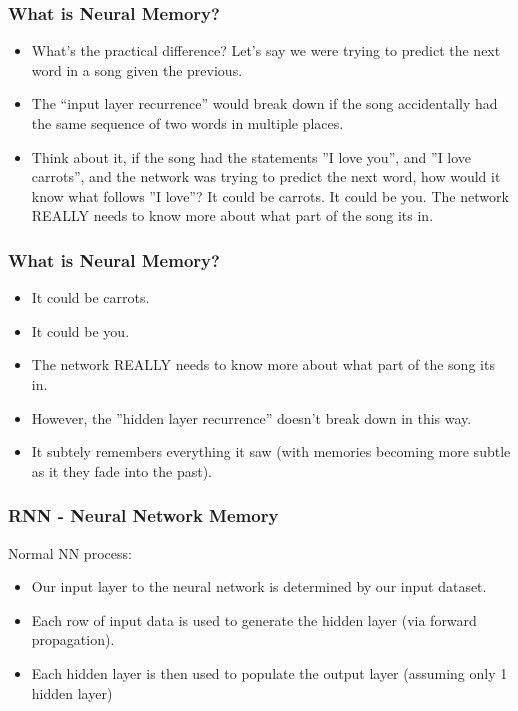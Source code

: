 \begin{frame}[fragile] \frametitle{What is Neural Memory?}
\begin{itemize}
\item  What's the practical difference? Let's say we were trying to predict the next word in a song given the previous. 
\item The ``input layer recurrence'' would break down if the song accidentally had the same sequence of two words in multiple places. 
\item Think about it, if the song had the statements ''I love you'', and ''I love carrots'', and the network was trying to predict the next word, how would it know what follows ''I love''? 
It could be carrots. It could be you. The network REALLY needs to know more about what part of the song its in.
\end{itemize}
\end{frame}


\begin{frame}[fragile] \frametitle{What is Neural Memory?}
\begin{itemize}
\item  It could be carrots. 
\item It could be you. 
\item The network REALLY needs to know more about what part of the song its in.
\item However, the ''hidden layer recurrence'' doesn't break down in this way. 
\item It subtely remembers everything it saw (with memories becoming more subtle as it they fade into the past).
\end{itemize}
\end{frame}


\begin{frame}[fragile] \frametitle{RNN - Neural Network Memory}
Normal NN process:
\begin{itemize}
\item Our input layer to the neural network is determined by our input dataset. 
\item Each row of input data is used to generate the hidden layer (via forward propagation). 
\item Each hidden layer is then used to populate the output layer (assuming only 1 hidden layer)
\end{itemize}
\end{frame}


